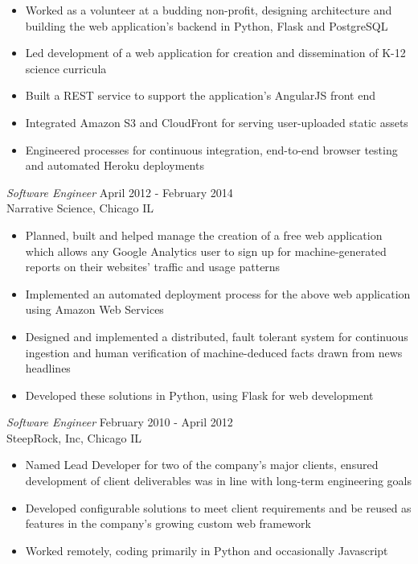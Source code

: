 \documentclass[line,margin]{res}
\begin{document}
\begin{resume}
\begin{itemize}
        \item Worked as a volunteer at a budding non-profit, designing
          architecture and building the web application's backend in
          Python, Flask and PostgreSQL
        \item Led development of a web application for creation and
          dissemination of K-12 science curricula
        \item Built a REST service to support the application's AngularJS
          front end
        \item Integrated Amazon S3 and CloudFront for serving
          user-uploaded static assets
        \item Engineered processes for continuous integration, end-to-end
          browser testing and automated Heroku deployments
        \end{itemize}

        {\sl Software Engineer} \hfill April 2012 - February 2014 \\
        Narrative Science, Chicago IL
        \begin{itemize}
        \item Planned, built and helped manage the creation of a
          free web application which allows any Google Analytics
          user to sign up for machine-generated reports on their
          websites' traffic and usage patterns
        \item Implemented an automated deployment process for the
          above web application using Amazon Web Services
        \item Designed and implemented a distributed, fault tolerant
          system for continuous ingestion and human verification of
          machine-deduced facts drawn from news headlines
        \item Developed these solutions in Python, using Flask for
          web development
        \end{itemize}

        {\sl Software Engineer} \hfill February 2010 - April 2012 \\
        SteepRock, Inc, Chicago IL
        \begin{itemize}
        \item Named Lead Developer for two of the company's major
          clients, ensured development of client
          deliverables was in line with long-term engineering goals
        \item Developed configurable solutions to meet client
          requirements and be reused as features in the company's
          growing custom web framework
        \item Worked remotely, coding primarily in Python and
          occasionally Javascript
        \end{itemize}


\end{resume}
\end{document}
